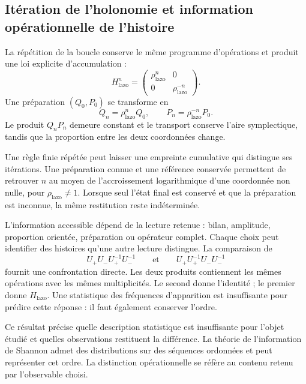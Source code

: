 \subsection{Itération de l’holonomie et information opérationnelle de l’histoire}
\label{subsec:narrativa-informacion-operacional}

La répétition de la boucle conserve le même programme d’opérations et
produit une loi explicite d’accumulation :
\begin{equation}
 H_{\mathrm{lazo}}^n=
 \begin{pmatrix}\rho_{\mathrm{lazo}}^n&0\\
                 0&\rho_{\mathrm{lazo}}^{-n}\end{pmatrix}.
 \label{eq:narrativa-iteracion-lazo}
\end{equation}
Une préparation $(Q_0,P_0)$ se transforme en
\begin{equation}
 Q_n=\rho_{\mathrm{lazo}}^nQ_0,
 \qquad
 P_n=\rho_{\mathrm{lazo}}^{-n}P_0.
 \label{eq:narrativa-iteracion-estado}
\end{equation}
Le produit $Q_nP_n$ demeure constant et le transport conserve
l’aire symplectique, tandis que la proportion entre les deux
coordonnées change.

Une règle finie répétée peut laisser une empreinte cumulative qui
distingue ses itérations. Une préparation connue et une référence
conservée permettent de retrouver $n$ au moyen de l’accroissement logarithmique
d’une coordonnée non nulle, pour $\rho_{\mathrm{lazo}}\ne1$.
Lorsque seul l’état final est
conservé et que la préparation est inconnue, la même
restitution reste indéterminée.

L’information accessible dépend de la lecture retenue : bilan,
amplitude, proportion orientée, préparation ou opérateur complet. Chaque
choix peut identifier des histoires qu’une autre lecture distingue.
La comparaison de
\begin{equation}
 U_+U_-U_+^{-1}U_-^{-1}
 \qquad\text{et}\qquad
 U_+U_+^{-1}U_-U_-^{-1}
 \label{eq:narrativa-orden-multiplicidades}
\end{equation}
fournit une confrontation directe. Les deux produits contiennent les mêmes
opérations avec les mêmes multiplicités. Le second donne l’identité ;
le premier donne $H_{\mathrm{lazo}}$. Une statistique des fréquences
d’apparition est insuffisante pour prédire cette réponse : il faut
également conserver l’ordre.

Ce résultat précise quelle description statistique est insuffisante
pour l’objet étudié et quelles observations restituent la différence.
La théorie de l’information de Shannon admet des distributions sur des
séquences ordonnées et peut représenter cet ordre. La distinction
opérationnelle se réfère au contenu retenu par l’observable choisi.

